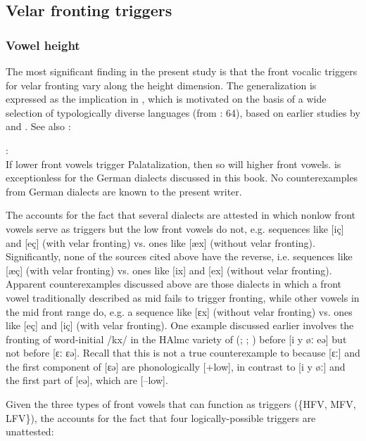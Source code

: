 \subsection{Velar fronting triggers}\label{sec:12.7.1}

\subsubsection{Vowel height}
The most significant finding in the present study is that the front vocalic triggers for velar fronting vary along the height dimension. The generalization is expressed as the implication in , which is motivated on the basis of a wide selection of typologically diverse languages (from \citealt{Bateman2007}: 64), based on earlier studies by \citet[37]{Neeld1973} and \citet[177]{Chen1973}. See also \citet{Kochetov2011}:

\eanoraggedright%
\label{ex:12:20}
  \textsc{}:\\
  If lower front vowels trigger Palatalization, then so will higher front vowels.
\z
{} is exceptionless for the German dialects discussed in this book. No counterexamples from German dialects are known to the present writer.

The  accounts for the fact that several dialects are attested in which nonlow front vowels serve as triggers but the low front vowels do not, e.g. sequences like [iç] and [eç] (with velar fronting) vs. ones like [æx] (without velar fronting). Significantly, none of the sources cited above have the reverse, i.e. sequences like [æç] (with velar fronting) vs. ones like [ix] and [ex] (without velar fronting). Apparent counterexamples discussed above are those dialects in which a front vowel traditionally described as mid fails to trigger fronting, while other vowels in the mid front range do, e.g. a sequence like [ɛx] (without velar fronting) vs. ones like [eç] and [iç] (with velar fronting). One example discussed earlier involves the fronting of word-initial /kx/ in the HAlmc variety of  (\citealt{Berger1913}; ; ) before [i y øː eə] but not before [ɛː ɛə]. Recall that this is not a true counterexample to  because [ɛː] and the first component of [ɛə] are phonologically [+low], in contrast to [i y øː] and the first part of [eə], which are [--low].

Given the three types of front vowels that can function as triggers (\{HFV, MFV, LFV\}), the  accounts for the fact that four logically-possible triggers are unattested:

